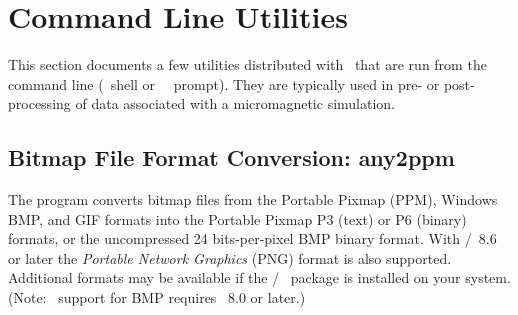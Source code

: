 \chapter{Command Line Utilities}\label{sec:cmdutils}

This section documents a few utilities distributed with \OOMMF\ that are
run from the command line (\Unix\ shell or \Windows\ \DOS\ prompt).
They are typically used in pre- or post-processing of data associated
with a micromagnetic simulation.


\section{Bitmap File Format Conversion:
          any2ppm}\label{sec:any2ppm}%
%
The  program converts bitmap files from the Portable Pixmap
(PPM), Windows BMP, and GIF formats into the Portable Pixmap P3
(text) or P6 (binary) formats, or the uncompressed 24 bits-per-pixel BMP
binary format.  With \Tcl/\Tk\ 8.6 or later
the \textit{Portable Network Graphics} (PNG) format is also
supported.  Additional formats may be available if the \Tcl/\Tk\
package is installed on your system.  (Note: \OOMMF\ support for BMP
requires \Tk\ 8.0\index{requirement!Tk~8.0+} or later.)

